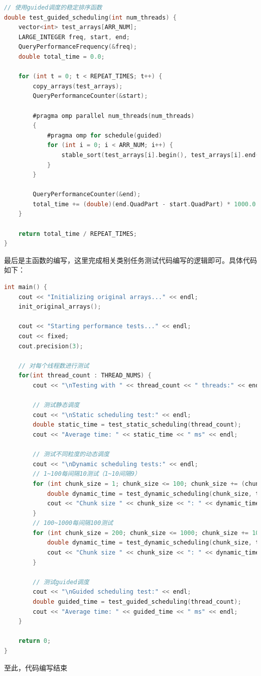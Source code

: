 \documentclass{nku}
\begin{document}
\begin{lstlisting}[language=C]
// 使用guided调度的稳定排序函数
double test_guided_scheduling(int num_threads) {
    vector<int> test_arrays[ARR_NUM];
    LARGE_INTEGER freq, start, end;
    QueryPerformanceFrequency(&freq);
    double total_time = 0.0;

    for (int t = 0; t < REPEAT_TIMES; t++) {
        copy_arrays(test_arrays);
        QueryPerformanceCounter(&start);

        #pragma omp parallel num_threads(num_threads)
        {
            #pragma omp for schedule(guided)
            for (int i = 0; i < ARR_NUM; i++) {
                stable_sort(test_arrays[i].begin(), test_arrays[i].end());
            }
        }

        QueryPerformanceCounter(&end);
        total_time += (double)(end.QuadPart - start.QuadPart) * 1000.0 / freq.QuadPart;
    }

    return total_time / REPEAT_TIMES;
}
\end{lstlisting}

最后是主函数的编写，这里完成相关类别任务测试代码编写的逻辑即可。具体代码如下：
\begin{lstlisting}[language=C]
int main() {
    cout << "Initializing original arrays..." << endl;
    init_original_arrays();

    cout << "Starting performance tests..." << endl;
    cout << fixed;
    cout.precision(3);

    // 对每个线程数进行测试
    for(int thread_count : THREAD_NUMS) {
        cout << "\nTesting with " << thread_count << " threads:" << endl;

        // 测试静态调度
        cout << "\nStatic scheduling test:" << endl;
        double static_time = test_static_scheduling(thread_count);
        cout << "Average time: " << static_time << " ms" << endl;

        // 测试不同粒度的动态调度
        cout << "\nDynamic scheduling tests:" << endl;
        // 1~100每间隔10测试（1~10间隔9）
        for (int chunk_size = 1; chunk_size <= 100; chunk_size += (chunk_size < 10 ? 9 : 10)) {
            double dynamic_time = test_dynamic_scheduling(chunk_size, thread_count);
            cout << "Chunk size " << chunk_size << ": " << dynamic_time << " ms" << endl;
        }
        // 100~1000每间隔100测试
        for (int chunk_size = 200; chunk_size <= 1000; chunk_size += 100) {
            double dynamic_time = test_dynamic_scheduling(chunk_size, thread_count);
            cout << "Chunk size " << chunk_size << ": " << dynamic_time << " ms" << endl;
        }

        // 测试guided调度
        cout << "\nGuided scheduling test:" << endl;
        double guided_time = test_guided_scheduling(thread_count);
        cout << "Average time: " << guided_time << " ms" << endl;
    }

    return 0;
}
\end{lstlisting}
至此，代码编写结束
\end{document}
